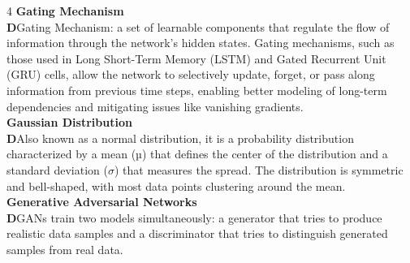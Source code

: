 \documentclass[8pt]{extarticle}
\newcommand{\dtag}{\textcolor{definitioncolor}{\tiny\textbf{D}}\;}
\begin{document}
\begin{multicols}{4}
\vspace{2pt}\textbf{Gating Mechanism}\\
\dtag Gating Mechanism: a set of learnable components that regulate the flow of information through the network's hidden states. Gating mechanisms, such as those used in Long Short-Term Memory (LSTM) and Gated Recurrent Unit (GRU) cells, allow the network to selectively update, forget, or pass along information from previous time steps, enabling better modeling of long-term dependencies and mitigating issues like vanishing gradients.\\
\vspace{2pt}\textbf{Gaussian Distribution}\\
\dtag Also known as a normal distribution, it is a probability distribution characterized by a mean (µ) that defines the center of the distribution and a standard deviation ($\sigma$) that measures the spread. The distribution is symmetric and bell-shaped, with most data points clustering around the mean.\\
\vspace{2pt}\textbf{Generative Adversarial Networks}\\
\dtag GANs train two models simultaneously: a generator that tries to produce realistic data samples and a discriminator that tries to distinguish generated samples from real data.\\


\end{multicols}
\end{document}
